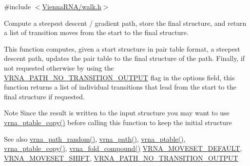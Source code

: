 {\ttfamily \#include $<$\hyperlink{walk_8h}{Vienna\+R\+N\+A/walk.\+h}$>$}



Compute a steepest descent / gradient path, store the final structure, and return a list of transition moves from the start to the final structure. 

This function computes, given a start structure in pair table format, a steepest descent path, updates the pair table to the final structure of the path. Finally, if not requested otherwise by using the \hyperlink{group__paths_ga1ee63e54ecf136491e12ff03ede2622d}{V\+R\+N\+A\+\_\+\+P\+A\+T\+H\+\_\+\+N\+O\+\_\+\+T\+R\+A\+N\+S\+I\+T\+I\+O\+N\+\_\+\+O\+U\+T\+P\+UT} flag in the {\ttfamily options} field, this function returns a list of individual transitions that lead from the start to the final structure if requested.

\begin{DoxyNote}{Note}
Since the result is written to the input structure you may want to use \hyperlink{group__struct__utils_ga2daefbbd6d9f8803731651882f54332d}{vrna\+\_\+ptable\+\_\+copy()} before calling this function to keep the initial structure
\end{DoxyNote}
\begin{DoxySeeAlso}{See also}
\hyperlink{group__paths_ga9234756c337078fa599529d3db70d913}{vrna\+\_\+path\+\_\+random()}, \hyperlink{group__paths_gab6aee4143f8b103518d5cbfe6bfe5eae}{vrna\+\_\+path()}, \hyperlink{group__struct__utils_gae829fb8bb7f694c12a9c0bbc34c77c60}{vrna\+\_\+ptable()}, \hyperlink{group__struct__utils_ga2daefbbd6d9f8803731651882f54332d}{vrna\+\_\+ptable\+\_\+copy()}, \hyperlink{group__fold__compound_ga6601d994ba32b11511b36f68b08403be}{vrna\+\_\+fold\+\_\+compound()} \hyperlink{group__neighbors_gaa5ffec4dd0d02df320f123e6888154d1}{V\+R\+N\+A\+\_\+\+M\+O\+V\+E\+S\+E\+T\+\_\+\+D\+E\+F\+A\+U\+LT}, \hyperlink{group__neighbors_ga68ea27c81de4b74e48b775c04052590b}{V\+R\+N\+A\+\_\+\+M\+O\+V\+E\+S\+E\+T\+\_\+\+S\+H\+I\+FT}, \hyperlink{group__paths_ga1ee63e54ecf136491e12ff03ede2622d}{V\+R\+N\+A\+\_\+\+P\+A\+T\+H\+\_\+\+N\+O\+\_\+\+T\+R\+A\+N\+S\+I\+T\+I\+O\+N\+\_\+\+O\+U\+T\+P\+UT}
\end{DoxySeeAlso}

